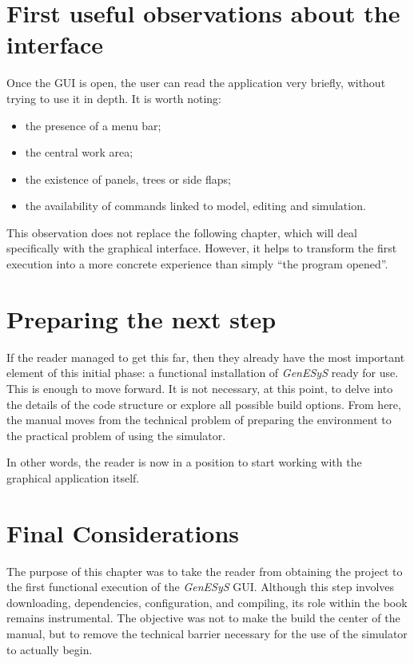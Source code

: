 \section{First useful observations about the interface}
\label{sec:cap2_primeiras_observacoes_interface}

Once the GUI is open, the user can read the application very briefly, without trying to use it in depth. It is worth noting:
\begin{itemize}
\item the presence of a menu bar;
\item the central work area;
\item the existence of panels, trees or side flaps;
\item the availability of commands linked to model, editing and simulation.
\end{itemize}

This observation does not replace the following chapter, which will deal specifically with the graphical interface. However, it helps to transform the first execution into a more concrete experience than simply ``the program opened''.

\section{Preparing the next step}
\label{sec:cap2_preparando_proximo_passo}

If the reader managed to get this far, then they already have the most important element of this initial phase: a functional installation of \textit{GenESyS} ready for use. This is enough to move forward. It is not necessary, at this point, to delve into the details of the code structure or explore all possible build options. From here, the manual moves from the technical problem of preparing the environment to the practical problem of using the simulator.

In other words, the reader is now in a position to start working with the graphical application itself.

\section{Final Considerations}
\label{sec:cap2_consideracoes_finais}

The purpose of this chapter was to take the reader from obtaining the project to the first functional execution of the \textit{GenESyS} GUI. Although this step involves downloading, dependencies, configuration, and compiling, its role within the book remains instrumental. The objective was not to make the build the center of the manual, but to remove the technical barrier necessary for the use of the simulator to actually begin.

